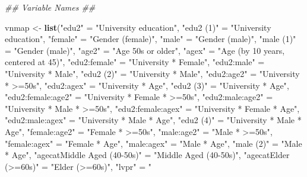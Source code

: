 \documentclass[
]{article}
\newenvironment{Shaded}{\begin{snugshade}}{\end{snugshade}}
\newcommand{\CommentTok}[1]{\textcolor[rgb]{0.56,0.35,0.01}{\textit{#1}}}
\newcommand{\KeywordTok}[1]{\textcolor[rgb]{0.13,0.29,0.53}{\textbf{#1}}}
\newcommand{\NormalTok}[1]{#1}
\newcommand{\StringTok}[1]{\textcolor[rgb]{0.31,0.60,0.02}{#1}}
\begin{document}
\begin{Shaded}
\begin{Highlighting}[]
\CommentTok{## Variable Names ##}

\NormalTok{vnmap <-}\StringTok{ }\KeywordTok{list}\NormalTok{(}\StringTok{"edu2"}\NormalTok{ =}\StringTok{ "University education"}\NormalTok{,}
              \StringTok{"edu2 (1)"}\NormalTok{ =}\StringTok{ "University education"}\NormalTok{,}
              \StringTok{"female"}\NormalTok{ =}\StringTok{ "Gender (female)"}\NormalTok{,}
              \StringTok{"male"}\NormalTok{ =}\StringTok{ "Gender (male)"}\NormalTok{,}
              \StringTok{"male (1)"}\NormalTok{ =}\StringTok{ "Gender (male)"}\NormalTok{,}
              \StringTok{"age2"}\NormalTok{ =}\StringTok{ "Age 50s or older"}\NormalTok{,}
              \StringTok{"agex"}\NormalTok{ =}\StringTok{ "Age (by 10 years, centered at 45)"}\NormalTok{,}
              \StringTok{"edu2:female"}\NormalTok{ =}\StringTok{ "University * Female"}\NormalTok{,}
              \StringTok{"edu2:male"}\NormalTok{ =}\StringTok{ "University * Male"}\NormalTok{,}
              \StringTok{"edu2 (2)"}\NormalTok{ =}\StringTok{ "University * Male"}\NormalTok{,}
              \StringTok{"edu2:age2"}\NormalTok{ =}\StringTok{ "University * >=50s"}\NormalTok{,}
              \StringTok{"edu2:agex"}\NormalTok{ =}\StringTok{ "University * Age"}\NormalTok{,}
              \StringTok{"edu2 (3)"}\NormalTok{ =}\StringTok{ "University * Age"}\NormalTok{,}
              \StringTok{"edu2:female:age2"}\NormalTok{ =}\StringTok{ "University * Female * >=50s"}\NormalTok{,}
              \StringTok{"edu2:male:age2"}\NormalTok{ =}\StringTok{ "University * Male * >=50s"}\NormalTok{,}
              \StringTok{"edu2:female:agex"}\NormalTok{ =}\StringTok{ "University * Female * Age"}\NormalTok{,}
              \StringTok{"edu2:male:agex"}\NormalTok{ =}\StringTok{ "University * Male * Age"}\NormalTok{,}
              \StringTok{"edu2 (4)"}\NormalTok{ =}\StringTok{ "University * Male * Age"}\NormalTok{,}
              \StringTok{"female:age2"}\NormalTok{ =}\StringTok{ "Female * >=50s"}\NormalTok{,}
              \StringTok{"male:age2"}\NormalTok{ =}\StringTok{ "Male * >=50s"}\NormalTok{,}
              \StringTok{"female:agex"}\NormalTok{ =}\StringTok{ "Female * Age"}\NormalTok{,}
              \StringTok{"male:agex"}\NormalTok{ =}\StringTok{ "Male * Age"}\NormalTok{,}
              \StringTok{"male (2)"}\NormalTok{ =}\StringTok{ "Male * Age"}\NormalTok{,}
              \StringTok{"agecatMiddle Aged (40-50s)"}\NormalTok{ =}\StringTok{ "Middle Aged (40-50s)"}\NormalTok{,}
              \StringTok{"agecatElder (>=60s)"}\NormalTok{ =}\StringTok{ "Elder (>=60s)"}\NormalTok{,}
              \StringTok{"lvpr"}\NormalTok{ =}\StringTok{ "% of Life Residing Locally (zip)"}\NormalTok{,}
}
\end{Highlighting}
\end{Shaded}
\end{document}
